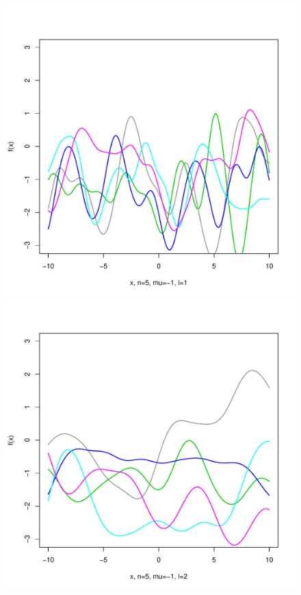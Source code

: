\documentclass[12pt,letterpaper]{article}
\begin{document}
\begin{figure}
\begin{center}
\includegraphics[scale=0.2]{hw321/n5-m-1-l1.pdf}
\includegraphics[scale=0.2]{hw321/n5-m-1-l2.pdf}

\end{center}
\end{figure}
\end{document}
